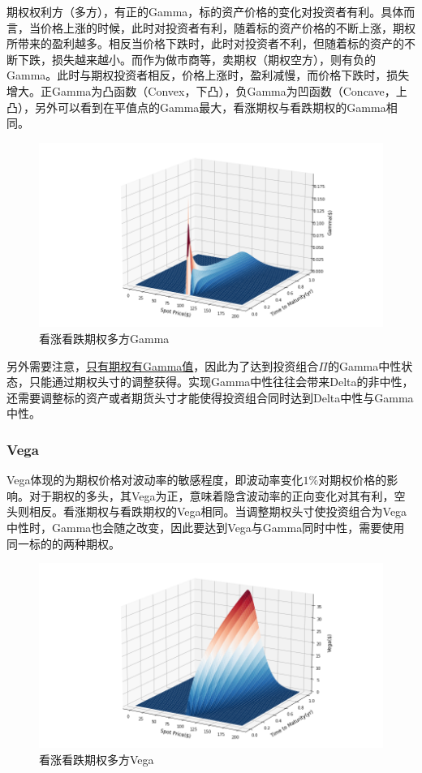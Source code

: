 \documentclass[11pt]{article}
\begin{document}
期权权利方（多方），有正的Gamma，标的资产价格的变化对投资者有利。具体而言，当价格上涨的时候，此时对投资者有利，随着标的资产价格的不断上涨，期权所带来的盈利越多。相反当价格下跌时，此时对投资者不利，但随着标的资产的不断下跌，损失越来越小。而作为做市商等，卖期权（期权空方），则有负的Gamma。此时与期权投资者相反，价格上涨时，盈利减慢，而价格下跌时，损失增大。正Gamma为凸函数（Convex，下凸），负Gamma为凹函数（Concave，上凸），另外可以看到在平值点的Gamma最大，看涨期权与看跌期权的Gamma相同。
\begin{figure}[H]
    \centering
    \includegraphics[width=\textwidth]{fig/gamma-surf.png}
    \caption{看涨看跌期权多方Gamma}
    \label{fig:gamma-surf}
\end{figure}

另外需要注意，\uline{只有期权有Gamma值}，因此为了达到投资组合$\Pi$的Gamma中性状态，只能通过期权头寸的调整获得。实现Gamma中性往往会带来Delta的非中性，还需要调整标的资产或者期货头寸才能使得投资组合同时达到Delta中性与Gamma中性。

\subsubsection{Vega}

Vega体现的为期权价格对波动率的敏感程度，即波动率变化$1\%$对期权价格的影响。对于期权的多头，其Vega为正，意味着隐含波动率的正向变化对其有利，空头则相反。看涨期权与看跌期权的Vega相同。当调整期权头寸使投资组合为Vega中性时，Gamma也会随之改变，因此要达到Vega与Gamma同时中性，需要使用同一标的的两种期权。
\begin{figure}[H]
    \centering
    \includegraphics[width=\textwidth]{fig/vega-surf.png}
    \caption{看涨看跌期权多方Vega}
    \label{fig:vega-surf}
\end{figure}
\end{document}
